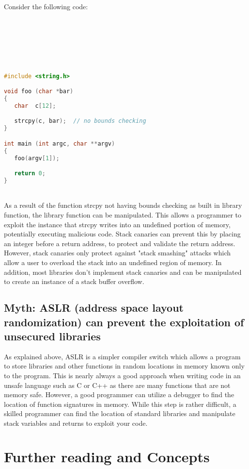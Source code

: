 \documentclass{article}
\newcommand\tab[1][1cm]{\hspace*{#1}}
\begin{document}
\begin{center}
\huge{Consider the following code:}
\end{center}
\\
\\\\\\\\
\begin{lstlisting}[language=C++]
#include <string.h>

void foo (char *bar)
{
   char  c[12];

   strcpy(c, bar);  // no bounds checking
}

int main (int argc, char **argv)
{
   foo(argv[1]);

   return 0;
}
\end{lstlisting}
\\
As a result of the function strcpy not having bounds checking as built in library function, the library function can be manipulated. This allows a programmer to exploit the instance that strcpy writes into an undefined portion of memory, potentially executing malicious code. Stack canaries can prevent this by placing an integer before a return address, to protect and validate the return address. However, stack canaries only protect against "stack smashing" attacks which allow a user to overload the stack into an undefined region of memory. In addition, most libraries don't implement stack canaries and can be manipulated to create an instance of a stack buffer overflow.
\\
\subsection{Myth: ASLR (address space layout randomization) can prevent the exploitation of unsecured libraries}
\tab As explained above, ASLR is a simpler compiler switch which allows a program to store libraries and other functions in random locations in memory known only to the program. This is nearly always a good approach when writing code in an unsafe language such as C or C++ as there are many functions that are not memory safe. However, a good programmer can utilize a debugger to find the location of function signatures in memory. While this step is rather difficult, a skilled programmer can find the location of standard libraries and manipulate stack variables and returns to exploit your code.
\\

\section{Further reading and Concepts}
\\
\end{document}
